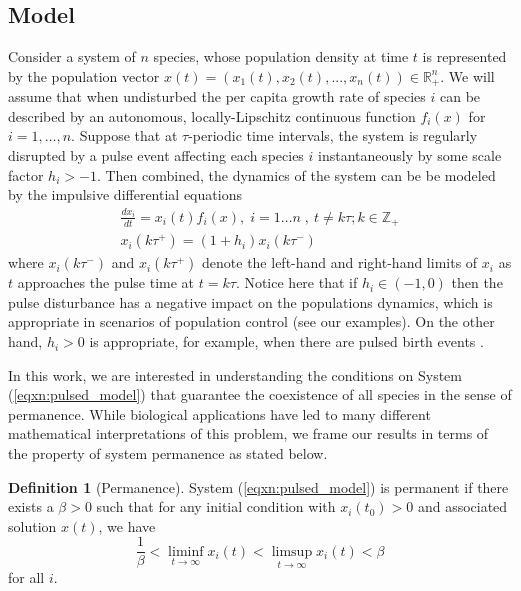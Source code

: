 \documentclass{article}
\theoremstyle{definition}
\newtheorem{definition}{Definition}[section]
\newcommand{\R}{{\mathbb{R}}}
\newcommand{\Z}{{\mathbb{Z}}}
\begin{document}
\subsection{Model}
Consider a system of $n$ species, whose population density at time $t$ is represented by the population vector $x(t)=(x_1(t), x_2(t),...,x_n(t)) \in \R^n_+$. We will assume that when undisturbed the per capita growth rate of species $i$ can be described by an autonomous, locally-Lipschitz continuous function $f_i(x)$ for $i = 1,\ldots,n$. Suppose that at $\tau$-periodic time intervals, the system is regularly disrupted by a pulse event affecting each species $i$ instantaneously by some scale factor $h_i > - 1$. Then combined, the dynamics of the system can be be modeled by the impulsive differential equations
\begin{equation} \label{eqxn:pulsed_model}
    \begin{split}
        \frac{dx_i}{dt} = x_i(t) f_i(x) ,\;  i = 1 \ldots n\; ,\ t \neq k\tau; k \in \Z_{+}\\
        x_i(k\tau^+) = (1+h_i)x_i(k\tau^-)
    \end{split}
\end{equation}
where $x_i(k\tau^-)$ and $x_i(k\tau^+)$ denote the left-hand and right-hand limits of $x_i$ as $t$ approaches the pulse time at $t=k\tau$. Notice here that if $h_i\in(-1,0)$ then the pulse disturbance has a negative impact on the populations dynamics, which is appropriate in scenarios of population control (see our examples). On the other hand, $h_i>0$ is appropriate, for example, when there are pulsed birth events \cite{lewis2012spreading, vasilyeva2016spread}. 



In this work, we are interested in understanding the conditions on System (\ref{eqxn:pulsed_model}) that guarantee the coexistence of all species in the sense of permanence. While biological applications have led to many different mathematical interpretations of this problem, we frame our results in terms of the property of system permanence as stated below. %

\begin{definition} [Permanence] \label{def:permanence}
System (\ref{eqxn:pulsed_model}) is permanent if there exists a $\beta > 0$ such that for any initial condition with $x_i(t_0) > 0$ and associated solution $x(t)$, we have
    \begin{equation*}
        \frac{1}{\beta} < \liminf_{t \to \infty} x_i(t) < \limsup_{t \to \infty} x_i(t) < \beta
    \end{equation*} for all $i$.
\end{definition}
\end{document}
